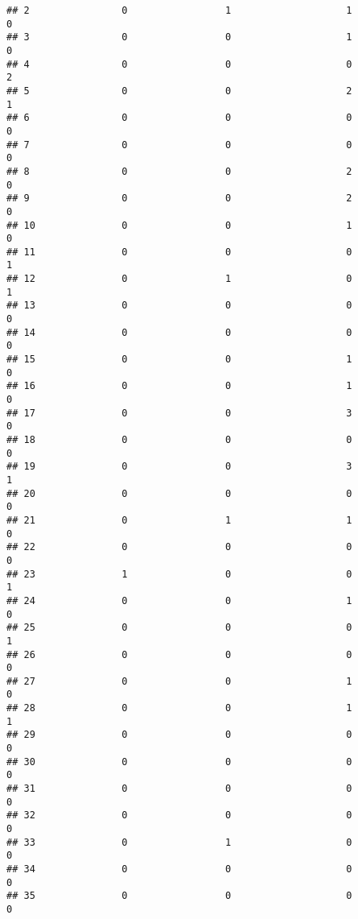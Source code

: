 \documentclass[
]{article}
\begin{document}
\begin{verbatim}
## 2                0                 1                    1               0
## 3                0                 0                    1               0
## 4                0                 0                    0               2
## 5                0                 0                    2               1
## 6                0                 0                    0               0
## 7                0                 0                    0               0
## 8                0                 0                    2               0
## 9                0                 0                    2               0
## 10               0                 0                    1               0
## 11               0                 0                    0               1
## 12               0                 1                    0               1
## 13               0                 0                    0               0
## 14               0                 0                    0               0
## 15               0                 0                    1               0
## 16               0                 0                    1               0
## 17               0                 0                    3               0
## 18               0                 0                    0               0
## 19               0                 0                    3               1
## 20               0                 0                    0               0
## 21               0                 1                    1               0
## 22               0                 0                    0               0
## 23               1                 0                    0               1
## 24               0                 0                    1               0
## 25               0                 0                    0               1
## 26               0                 0                    0               0
## 27               0                 0                    1               0
## 28               0                 0                    1               1
## 29               0                 0                    0               0
## 30               0                 0                    0               0
## 31               0                 0                    0               0
## 32               0                 0                    0               0
## 33               0                 1                    0               0
## 34               0                 0                    0               0
## 35               0                 0                    0               0

\end{verbatim}
\end{document}
